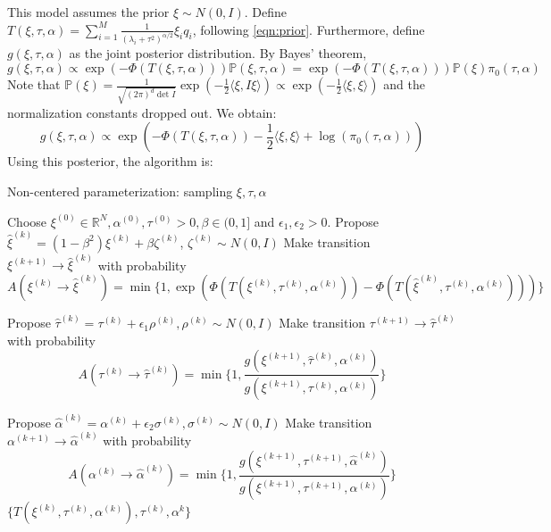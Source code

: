 \documentclass{siamart1116}
\begin{document}
\begin{algorithm}
This model assumes the prior $\xi \sim N(0,I)$. Define $T(\xi,\tau,\alpha) = \sum_{i=1}^M \frac{1}{(\lambda_i+\tau^2)^{\alpha/2}}\xi_iq_i$, following \cref{eqn:prior}. Furthermore, define $g(\xi,\tau,\alpha)$ as the joint posterior distribution. By Bayes' theorem, 
\[g(\xi,\tau,\alpha) \propto \exp(-\Phi(T(\xi,\tau,\alpha)))\mathbb{P}(\xi,\tau,\alpha) = \exp(-\Phi(T(\xi,\tau,\alpha)))\mathbb{P}(\xi)\pi_0(\tau, \alpha)\]
Note that $\mathbb{P}(\xi) = \frac{1}{\sqrt{(2\pi)^d \det I}} \exp(-\frac{1}{2}\langle \xi, I\xi  \rangle) \propto \exp(-\frac{1}{2}\langle \xi,\xi \rangle)$ and the normalization constants dropped out. We obtain:
\[ g(\xi,\tau,\alpha) \propto \exp\left( -\Phi(T(\xi,\tau,\alpha))-\frac{1}{2}\langle \xi,\xi \rangle + \log(\pi_0(\tau,\alpha)) \right)\]
Using this posterior, the algorithm is:
\caption{Non-centered parameterization: sampling $\xi, \tau, \alpha$}
\label{alg:xi_tau_alpha}
\begin{algorithmic}
\State Choose $\xi^{(0)} \in \mathbb{R}^N, \alpha^{(0)}, \tau^{(0)} > 0, \beta \in (0, 1]$ and $\epsilon_1, \epsilon_2 > 0$.
\State Propose $\hat\xi^{(k)} = (1-\beta^2)\xi^{(k)} + \beta \zeta^{(k)}$, $\zeta^{(k)} \sim N(0, I)$
\State Make transition $\xi^{(k+1)} \to \hat\xi^{(k)}$ with probability
\[ A(\xi^{(k)} \to \hat\xi^{(k)}) = \min\{1, \exp\left(\Phi(T(\xi^{(k)},\tau^{(k)},\alpha^{(k)})) - \Phi(T(\hat\xi^{(k)},\tau^{(k)},\alpha^{(k)}))\right) \}\]

\State Propose $\hat\tau^{(k)} = \tau^{(k)} + \epsilon_1 \rho^{(k)}, \rho^{(k)} \sim N(0,I)$
\State Make transition $\tau^{(k+1)} \to \hat\tau^{(k)}$ with probability
\[ A(\tau^{(k)} \to \hat\tau^{(k)}) = \min\{1, \frac{g(\xi^{(k+1)},\hat\tau^{(k)},\alpha^{(k)})}{g(\xi^{(k+1)},\tau^{(k)},\alpha^{(k)})} \}\]

\State Propose $\hat\alpha^{(k)} = \alpha^{(k)} + \epsilon_2 \sigma^{(k)}, \sigma^{(k)} \sim N(0,I)$
\State Make transition $\alpha^{(k+1)} \to \hat\alpha^{(k)}$ with probability
\[ A(\alpha^{(k)} \to \hat\alpha^{(k)}) = \min\{1, \frac{g(\xi^{(k+1)},\tau^{(k+1)},\hat \alpha^{(k)})}{g(\xi^{(k+1)},\tau^{(k+1)},\alpha^{(k)})} \}\]
\EndFor
\State \Return $\{ T(\xi^{(k)},\tau^{(k)},\alpha^{(k)}), \tau^{(k)}, \alpha^{k} \}$
\end{algorithmic}
\end{algorithm}
\end{document}
